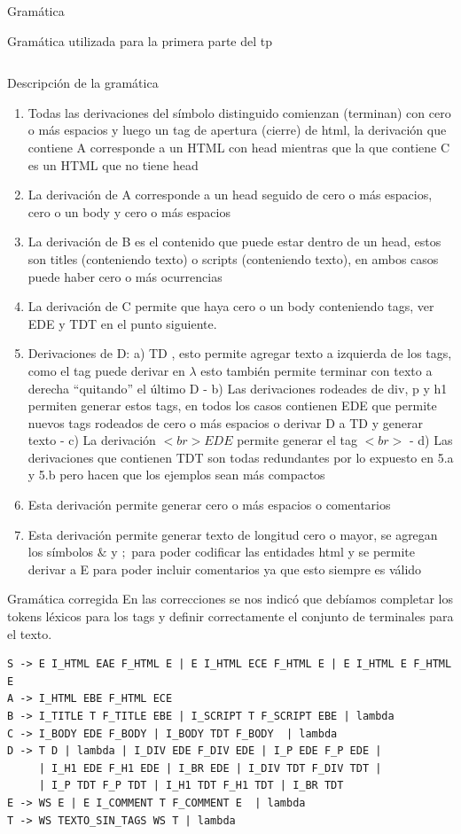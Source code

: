 \documentclass[a4paper,8pt]{article}
\begin{document}
\begin{section}{Gramática}
\begin{subsection}{Gramática utilizada para la primera parte del tp}
\begin{verbatim}
\end{verbatim}
\bigskip

Descripción de la gramática
\begin{enumerate}
 \item Todas las derivaciones del símbolo distinguido comienzan (terminan) con cero o más espacios y luego un tag de apertura (cierre) de html, la derivación que contiene A corresponde a un HTML con head mientras que la que contiene C es un HTML que no tiene head
 \item La derivación de A corresponde a un head seguido de cero o más espacios, cero o un body y cero o más espacios
\item La derivación de B es el contenido que puede estar dentro de un head, estos son titles (conteniendo texto) o scripts (conteniendo texto), en ambos casos puede haber cero o más ocurrencias
\item La derivación de C permite que haya cero o un body conteniendo tags, ver EDE y TDT en el punto siguiente.
\item Derivaciones de D: a) TD  , esto permite agregar texto a izquierda de los tags, como el tag puede derivar en $\lambda$ esto también permite terminar con texto a derecha “quitando” el último D - b) Las derivaciones rodeades de div, p y h1 permiten generar estos tags, en todos los casos contienen EDE que permite nuevos tags rodeados de cero o más espacios o derivar D a TD y generar texto - c) La derivación $<br>EDE$ permite generar el tag $<br>$ - d) Las derivaciones que contienen TDT son todas redundantes por lo expuesto en 5.a y 5.b pero hacen que los ejemplos sean más compactos
\item Esta derivación permite generar cero o más espacios o comentarios
\item Esta derivación permite generar texto de longitud cero o mayor, se agregan los símbolos $\&$ y $;$ para poder codificar las entidades html y se permite derivar a E para poder incluir comentarios ya que esto siempre es válido
\end{enumerate}

\end{subsection}

\begin{subsection}{Gramática corregida}
En las correcciones se nos indicó que debíamos completar los tokens léxicos para los tags y definir correctamente el conjunto de terminales para el texto.
\bigskip

\begin{verbatim}
S -> E I_HTML EAE F_HTML E | E I_HTML ECE F_HTML E | E I_HTML E F_HTML E
A -> I_HTML EBE F_HTML ECE
B -> I_TITLE T F_TITLE EBE | I_SCRIPT T F_SCRIPT EBE | lambda
C -> I_BODY EDE F_BODY | I_BODY TDT F_BODY  | lambda
D -> T D | lambda | I_DIV EDE F_DIV EDE | I_P EDE F_P EDE | 
     | I_H1 EDE F_H1 EDE | I_BR EDE | I_DIV TDT F_DIV TDT | 
     | I_P TDT F_P TDT | I_H1 TDT F_H1 TDT | I_BR TDT
E -> WS E | E I_COMMENT T F_COMMENT E  | lambda 
T -> WS TEXTO_SIN_TAGS WS T | lambda 


\end{verbatim}
\end{subsection}
\end{section}
\end{document}
